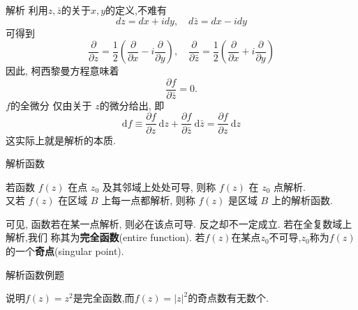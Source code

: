 \documentclass[fontset=windows, chinese, 10pt]{beamer}
\begin{document}
\begin{frame}{解析}
  利用$z,\bar{z}$的关于$x,y$的定义,不难有
  \begin{equation}
      d z=d x+i d y, \quad d \bar{z}=d x-i d y
  \end{equation}
  可得到
  \begin{equation}
      \frac{\partial}{\partial z}=\frac{1}{2}\left(\frac{\partial}{\partial x}-i \frac{\partial}{\partial y}\right), \quad \frac{\partial}{\partial \bar{z}}=\frac{1}{2}\left(\frac{\partial}{\partial x}+i \frac{\partial}{\partial y}\right)
  \end{equation}
  因此, 柯西黎曼方程意味着
  \begin{equation}
      \frac{\partial f}{\partial \bar{z}}=0.
  \end{equation}
  $f$的全微分 仅由关于 $z$的微分给出, 即
  \begin{equation}
  \mathrm{d}f \equiv \frac{\partial f}{\partial z} \mathrm{~d} z+\frac{\partial f}{\partial \bar{z}} \mathrm{~d} \bar{z}=\frac{\partial f}{\partial z} \mathrm{~d} z
  \end{equation}
  这实际上就是解析的本质.
\end{frame}

\begin{frame}{解析函数}
\begin{definition}
若函数 $f(z)$ 在点 $z_0$ 及其邻域上处处可导, 则称 $f(z)$ 在 $z_0$ 点解析.\\
 又若 $f(z)$ 在区域 $B$ 上每一点都解析, 则称 $f(z)$ 是区域 $B$ 上的解析函数.
\end{definition} 

 可见, 函数若在某一点解析, 则必在该点可导. 反之却不一定成立. 若在全复数域上解析,我们
 称其为{\bf 完全函数}(entire function).
 若$f(z)$在某点$z_0$不可导,$z_0$称为$f(z)$的一个{\bf 奇点}(singular point).



\end{frame}

\begin{frame}{解析函数例题}
  \begin{example}
说明$f(z)=z^2$是完全函数,而$f(z)=|z|^2$的奇点数有无数个.
\end{example}
\end{frame}
\end{document}
